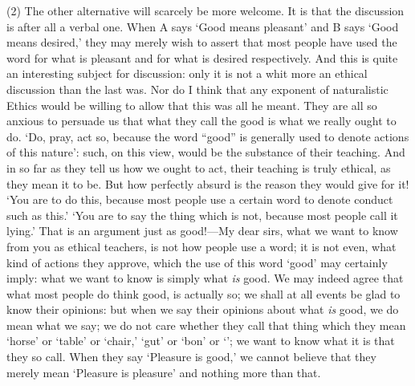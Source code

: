 (2) The other alternative will scarcely be more welcome. It is that
the discussion is after all a verbal one. When A says `Good means
pleasant' and B says `Good means desired,' they may merely wish to
assert that most people have used the word  for what is
pleasant and for what is desired respectively. And this is quite an
interesting subject for discussion: only it is not a whit more an
ethical discussion than the last was. Nor do I think that any exponent
of naturalistic Ethics would be willing to allow that this was all he
meant. They are all so anxious to persuade us that what they call the
good is what we really ought to do. `Do, pray, act so, because the
word ``good'' is generally used to denote actions of this nature':
such, on this view, would be the substance of their teaching. And in
so far as they tell us how we ought to act, their teaching is truly
ethical, as they mean it to be. But how perfectly absurd is the reason
they would give for it! `You are to do this, because most people use a
certain word to denote conduct such as this.' `You are to say the
thing which is not, because most people call it lying.' That is an
argument just as good!---My dear sirs, what we want to know from you
as ethical teachers, is not how people use a word; it is not even,
what kind of actions they approve, which the use of this word `good'
may certainly imply: what we want to know is simply what \textit{is}
good. We may indeed agree that what most people do think good, is
actually so; we shall at all events be glad to know their opinions:
but when we say their opinions about what \textit{is} good, we do mean
what we say; we do not care whether they call that thing which they
mean `horse' or `table' or `chair,' `gut' or `bon' or `';
we want to know what it is that they so call. When they say `Pleasure
is good,' we cannot believe that they merely mean `Pleasure is
pleasure' and nothing more than that.

